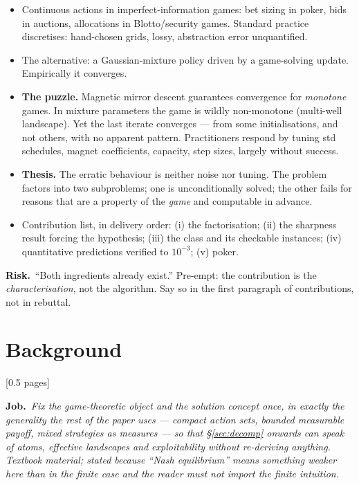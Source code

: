 \documentclass[11pt]{article}
\newcommand{\job}[1]{\par\smallskip\noindent
  \textcolor{jobc}{\textbf{Job.}}\ \emph{#1}\par\smallskip}
\newcommand{\risk}[1]{\par\noindent
  \textcolor{riskc}{\textbf{Risk.}}\ #1\par\smallskip}
\newcommand{\budget}[1]{\hfill{\small\textsf{[#1]}}}
\theoremstyle{definition}
\theoremstyle{remark}
\begin{document}
\begin{itemize}[leftmargin=1.2em]
\item Continuous actions in imperfect-information games: bet sizing in poker,
  bids in auctions, allocations in Blotto/security games. Standard practice
  discretises: hand-chosen grids, lossy, abstraction error unquantified.
\item The alternative: a Gaussian-mixture policy driven by a game-solving update.
  Empirically it converges.
\item \textbf{The puzzle.} Magnetic mirror descent guarantees convergence for
  \emph{monotone} games. In mixture parameters the game is wildly non-monotone
  (multi-well landscape). Yet the last iterate converges --- from some
  initialisations, and not others, with no apparent pattern. Practitioners
  respond by tuning std schedules, magnet coefficients, capacity, step sizes,
  largely without success.
\item \textbf{Thesis.} The erratic behaviour is neither noise nor tuning. The
  problem factors into two subproblems; one is unconditionally solved; the other
  fails for reasons that are a property of the \emph{game} and computable in
  advance.
\item Contribution list, in delivery order: (i) the factorisation; (ii) the
  sharpness result forcing the hypothesis; (iii) the class and its checkable
  instances; (iv) quantitative predictions verified to $10^{-3}$; (v) poker.
\end{itemize}

\risk{``Both ingredients already exist.'' Pre-empt: the contribution is the
\emph{characterisation}, not the algorithm. Say so in the first paragraph of
contributions, not in rebuttal.}

\section{Background}\label{sec:bg}
\budget{0.5 pages}

\job{Fix the game-theoretic object and the solution concept once, in exactly the
generality the rest of the paper uses --- compact action sets, bounded measurable
payoff, mixed strategies as measures --- so that \S\ref{sec:decomp} onwards can
speak of atoms, effective landscapes and exploitability without re-deriving
anything. Textbook material; stated because ``Nash equilibrium'' means something
weaker here than in the finite case and the reader must not import the finite
intuition.}
\end{document}
